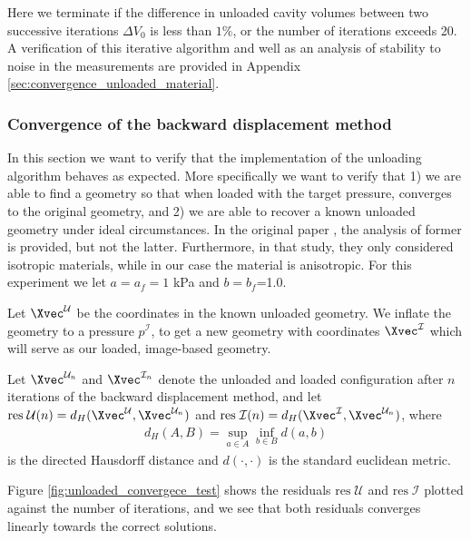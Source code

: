 Here we terminate if the difference in unloaded cavity volumes between
two successive iterations $\Delta V_0$ is less than $1 \%$, or the
number of iterations exceeds 20. A verification of this iterative
algorithm and well as an analysis of stability to noise in the
measurements are provided in Appendix
\ref{sec:convergence_unloaded_material}.  



\subsubsection{Convergence of the backward displacement method}
\label{sec:convergence_unloading}
In this section we want to verify that the implementation of the
unloading algorithm behaves as expected. More specifically we want to
verify that 1) we are able to find a geometry so that when loaded with
the target pressure, converges to the original geometry, and 2) we are
able to recover a known unloaded geometry under ideal
circumstances. In the original paper \cite{bols2013computational}, the
analysis of former is provided, but not the latter. Furthermore, in
that study, they only considered isotropic materials, while in our
case the material is anisotropic. For this experiment we let $a=a_f =
1$ kPa and $b=b_f$=1.0. 

Let $\Xvec^{\mathcal{U}}$ be the coordinates in the known unloaded
geometry. We inflate the geometry to a pressure $p^{\mathcal{I}}$,
to get a new geometry with coordinates $\Xvec^{\mathcal{I}}$ which
will serve as our loaded, image-based geometry.

Let $\Xvec^{\mathcal{U}_n}$ and $\Xvec^{\mathcal{I}_n}$ denote the
unloaded and loaded configuration after $n$ iterations of the backward
displacement method, and let $\mathrm{res}\;\mathcal{U} (n) =
d_H(\Xvec^{\mathcal{U}}, \Xvec^{\mathcal{U}_n}) $ and $\mathrm{res}\;\mathcal{I} (n) =
d_H(\Xvec^{\mathcal{I}}, \Xvec^{\mathcal{U}_n}) $, where
\begin{align}
  d_H(A, B) = \sup_{a \in A} \inf_{b \in B} d(a,b) 
\end{align}
is the directed Hausdorff distance \cite{huttenlocher1993comparing}
and $d(\cdot, \cdot)$ is the standard euclidean metric.

Figure \ref{fig:unloaded_convergece_test} shows the residuals $\mathrm{res}\;\mathcal{U}$
and $\mathrm{res}\;\mathcal{I}$ plotted against the number of
iterations, and we see that both residuals converges linearly towards
the correct solutions. 


